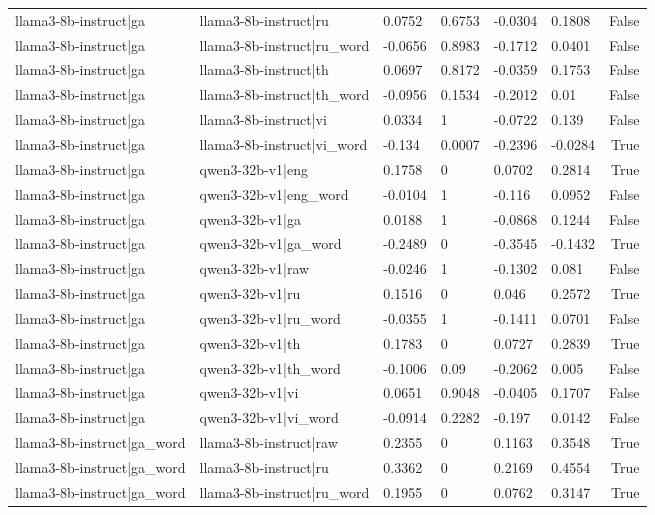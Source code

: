 \begin{table}
\begin{tabular}{llllllr}
llama3-8b-instruct|ga & llama3-8b-instruct|ru & 0.0752 & 0.6753 & -0.0304 & 0.1808 & False \\
llama3-8b-instruct|ga & llama3-8b-instruct|ru_word & -0.0656 & 0.8983 & -0.1712 & 0.0401 & False \\
llama3-8b-instruct|ga & llama3-8b-instruct|th & 0.0697 & 0.8172 & -0.0359 & 0.1753 & False \\
llama3-8b-instruct|ga & llama3-8b-instruct|th_word & -0.0956 & 0.1534 & -0.2012 & 0.01 & False \\
llama3-8b-instruct|ga & llama3-8b-instruct|vi & 0.0334 & 1 & -0.0722 & 0.139 & False \\
llama3-8b-instruct|ga & llama3-8b-instruct|vi_word & -0.134 & 0.0007 & -0.2396 & -0.0284 & True \\
llama3-8b-instruct|ga & qwen3-32b-v1|eng & 0.1758 & 0 & 0.0702 & 0.2814 & True \\
llama3-8b-instruct|ga & qwen3-32b-v1|eng_word & -0.0104 & 1 & -0.116 & 0.0952 & False \\
llama3-8b-instruct|ga & qwen3-32b-v1|ga & 0.0188 & 1 & -0.0868 & 0.1244 & False \\
llama3-8b-instruct|ga & qwen3-32b-v1|ga_word & -0.2489 & 0 & -0.3545 & -0.1432 & True \\
llama3-8b-instruct|ga & qwen3-32b-v1|raw & -0.0246 & 1 & -0.1302 & 0.081 & False \\
llama3-8b-instruct|ga & qwen3-32b-v1|ru & 0.1516 & 0 & 0.046 & 0.2572 & True \\
llama3-8b-instruct|ga & qwen3-32b-v1|ru_word & -0.0355 & 1 & -0.1411 & 0.0701 & False \\
llama3-8b-instruct|ga & qwen3-32b-v1|th & 0.1783 & 0 & 0.0727 & 0.2839 & True \\
llama3-8b-instruct|ga & qwen3-32b-v1|th_word & -0.1006 & 0.09 & -0.2062 & 0.005 & False \\
llama3-8b-instruct|ga & qwen3-32b-v1|vi & 0.0651 & 0.9048 & -0.0405 & 0.1707 & False \\
llama3-8b-instruct|ga & qwen3-32b-v1|vi_word & -0.0914 & 0.2282 & -0.197 & 0.0142 & False \\
llama3-8b-instruct|ga_word & llama3-8b-instruct|raw & 0.2355 & 0 & 0.1163 & 0.3548 & True \\
llama3-8b-instruct|ga_word & llama3-8b-instruct|ru & 0.3362 & 0 & 0.2169 & 0.4554 & True \\
llama3-8b-instruct|ga_word & llama3-8b-instruct|ru_word & 0.1955 & 0 & 0.0762 & 0.3147 & True \\

\end{tabular}
\end{table}
